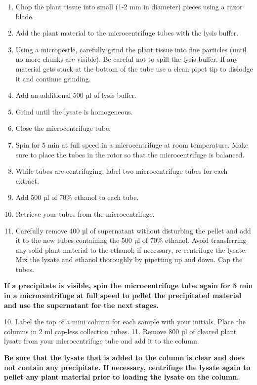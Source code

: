 \documentclass[]{book}
\providecommand{\tightlist}{%
  \setlength{\itemsep}{0pt}\setlength{\parskip}{0pt}}
\theoremstyle{definition}
\theoremstyle{definition}
\theoremstyle{definition}
\theoremstyle{remark}
\let\BeginKnitrBlock\begin \let\EndKnitrBlock\end
\begin{document}
\begin{enumerate}
\def\labelenumi{\arabic{enumi}.}
\setcounter{enumi}{3}
\tightlist
\item
  Chop the plant tissue into small (1-2 mm in diameter) pieces using a
  razor blade.
\item
  Add the plant material to the microcentrifuge tubes with the lysis
  buffer.
\item
  Using a micropestle, carefully grind the plant tissue into fine
  particles (until no more chunks are visible). Be careful not to spill
  the lysis buffer. If any material gets stuck at the bottom of the tube
  use a clean pipet tip to dislodge it and continue grinding.
\item
  Add an additional 500 µl of lysis buffer.
\item
  Grind until the lysate is homogeneous.
\item
  Close the microcentrifuge tube.
\item
  Spin for 5 min at full speed in a microcentrifuge at room temperature.
  Make sure to place the tubes in the rotor so that the microcentrifuge
  is balanced.\\
\item
  While tubes are centrifuging, label two microcentrifuge tubes for each
  extract.
\item
  Add 500 µl of 70\% ethanol to each tube.
\item
  Retrieve your tubes from the microcentrifuge.
\item
  Carefully remove 400 µl of supernatant without disturbing the pellet
  and add it to the new tubes containing the 500 µl of 70\% ethanol.
  Avoid transferring any solid plant material to the ethanol; if
  necessary, re-centrifuge the lysate. Mix the lysate and ethanol
  thoroughly by pipetting up and down. Cap the tubes.
\end{enumerate}

\BeginKnitrBlock{rmdimportant}
\textbf{If a precipitate is visible, spin the microcentrifuge tube again
for 5 min in a microcentrifuge at full speed to pellet the precipitated
material and use the supernatant for the next stages.}
\EndKnitrBlock{rmdimportant} 10. Label the top of a mini column for each
sample with your initials. Place the columns in 2 ml cap-less collection
tubes. 11. Remove 800 µl of cleared plant lysate from your
microcentrifuge tube and add it to the column.

\BeginKnitrBlock{rmdimportant}
\textbf{Be sure that the lysate that is added to the column is clear and
does not contain any precipitate. If necessary, centrifuge the lysate
again to pellet any plant material prior to loading the lysate on the
column.}
\EndKnitrBlock{rmdimportant}
\end{document}
